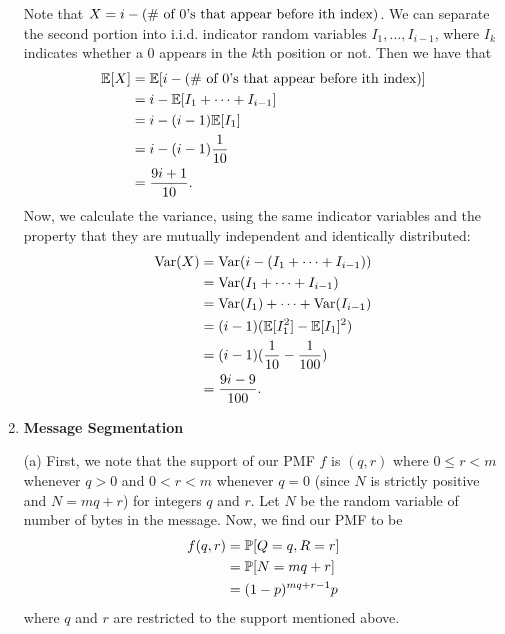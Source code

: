 \begin{enumerate}
    Note that $X = i - (\f{\# of 0's that appear before ith index})$. We can separate the second portion into i.i.d. indicator random variables $I_1, \dots, I_{i - 1}$, where $I_k$ indicates whether a 0 appears in the $k$th position or not. Then we have that
    \begin{align*}
    \E[X] &= \E[i - (\f{\# of 0's that appear before ith index})] \\
        &= i - \E[I_1 + \dots + I_{i - 1}] \\
        &= i - (i - 1)\E[I_1] \\
        &= i - (i - 1)\frac{1}{10} \\
        &= \frac{9i + 1}{10}.
    \end{align*}
    Now, we calculate the variance, using the same indicator variables and the property that they are mutually independent and identically distributed:
    \begin{align*}
        \f{Var}(X) &= \f{Var}(i - (I_1 + \dots + I_{i - 1})) \\
            &= \f{Var}(I_1 + \dots + I_{i - 1}) \\
            &= \f{Var}(I_1) + \dots + \f{Var}(I_{i - 1}) \\
            &= (i - 1)(\E[I_1^2] - \E[I_1]^2) \\
            &= (i - 1)(\frac{1}{10} - \frac{1}{100}) \\
            &= \frac{9i - 9}{100}.
    \end{align*}
    
    \item \textbf{Message Segmentation}
    
    (a) First, we note that the support of our PMF $f$ is $(q, r)$ where $0 \leq r < m$ whenever $q > 0$ and $0 < r < m$ whenever $q = 0$ (since $N$ is strictly positive and $N = mq + r$) for integers $q$ and $r$. Let $N$ be the random variable of number of bytes in the message. Now, we find our PMF to be
    \begin{align*}
        f(q, r) &= \P[Q = q, R = r] \\
            &= \P[N = mq + r] \\
            &= (1 - p)^{mq + r - 1}p
    \end{align*}
    where $q$ and $r$ are restricted to the support mentioned above.
    

\end{enumerate}
